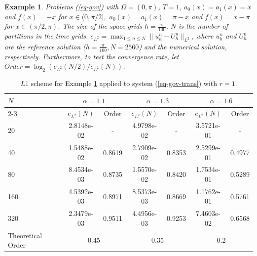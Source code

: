 \documentclass[11pt]{article}
\newtheorem{example}{Example}
\numberwithin{equation}{section}
\begin{document}
\iffalse
\begin{example}\label{ex1}
Problems (\ref{eq-gov}) with $\Omega=(0,\pi)$, $T=1$, 
$a_0(x)=a_1(x)=x$ and $f(x)=-x$ for $x\in(0,\pi/2],$ $a_0(x)=a_1(x)=\pi-x$ and $f(x)=x-\pi$ for $x\in(\pi/2,\pi)$.
The size of the space grids $h=\frac{\pi}{100}$, $N$ is the number of partitions in the time
grids. $e_{L^2}=\max_{1\leq n\leq N}\|u_h^n-U_h^n\|_{L^2}$, where $u_h^n$ and $U_h^n$ are the reference solution ($h=\frac{\pi}{100},N=2560$) and the numerical solution, respectively. Furthermore, to test the convergence rate, let $Order=\log_2(e_{L^2}(N/2)/e_{L^2}(N))$.
\end{example}

\begin{table}[!ht]
\caption{$L1$ scheme for Example \ref{ex1} applied to system (\ref{eq-gov-trans}) with $r =1$.}\label{table1}
\renewcommand{\arraystretch}{1}
\def\temptablewidth{0.95\textwidth}
\begin{center}
 \begin{tabular*}{\temptablewidth}{@{\extracolsep{\fill}}lcccccc}\hline
 $N$  &\multicolumn{2}{c}{$\alpha=1.1$} &\multicolumn{2}{c}{$\alpha=1.3$} &\multicolumn{2}{c}{$\alpha=1.6$}\\
 \cline{2-3}\cline{4-5}\cline{6-7}
 & $e_{L^{2}}(N)$         &Order     &$e_{L^{2}}(N)$    &Order    &$e_{L^{2}}(N)$ &Order     \\ \hline   
 20  &2.8148e-02   &-       &4.9798e-02   &-        &3.5721e-01  &-  \\
 40  &1.5488e-02   &0.8619  &2.7909e-02   &0.8353   &2.5299e-01  &0.4977    \\
 80  &8.4534e-03   &0.8735  &1.5570e-02   &0.8420   &1.7534e-01  &0.5289 \\
 160 &4.5392e-03   &0.8971  &8.5373e-03   &0.8669   &1.1762e-01  &0.5761    \\
 320 &2.3479e-03   &0.9511  &4.4956e-03   &0.9253   &7.4603e-02  &0.6568  \\\hline
 Theoretical Order
 &\multicolumn{2}{c}{0.45} &\multicolumn{2}{c}{0.35}&\multicolumn{2}{c}{0.2}\\ \hline
\end{tabular*}
\end{center}
\end{table}
\end{document}
